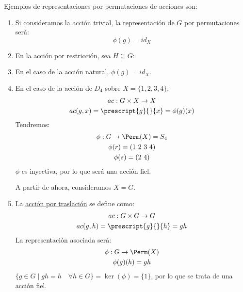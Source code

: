 \begin{ejemplo}
    Ejemplos de representaciones por permutaciones de acciones son:
    \begin{enumerate}
        \item Si consideramos la acción trivial, la representación de $G$ por permutaciones será:
            \begin{equation*}
                \phi(g) = id_X
            \end{equation*}
        \item En la acción por restricción, sea $H\subseteq G$:
            \begin{figure}[H]
                \centering
            \end{figure}
        \item En el caso de la acción natural, $\phi(g) = id_X$.
        \item En el caso de la acción de $D_4$ sobre $X = \{1,2,3,4\}$:
            \begin{gather*}
                ac:G\times X \to X \\
                ac(g,x) = \prescript{g}{}{x} = \phi(g)(x)
            \end{gather*}
            Tendremos:
            \begin{gather*}
                \phi:G\to\Perm(X) = S_4 \\
                \phi(r) = (1\ 2\ 3\ 4) \\
                \phi(s) = (2\ 4)
            \end{gather*}
            $\phi$ es inyectiva, por lo que será una acción fiel.

            A partir de ahora, consideramos $X = G$.
        \item La \underline{acción por traslación} se define como:
            \begin{gather*}
                ac:G\times G \to G \\
                ac(g,h) = \prescript{g}{}{h} = gh
            \end{gather*}
            La representación asociada será:
            \begin{gather*}
                \phi:G\to\Perm(X) \\
                \phi(g)(h) = gh
            \end{gather*}
            $\{g\in G\mid gh = h \quad \forall h\in G\} = \ker(\phi) = \{1\}$, por lo que se trata de una acción fiel.
    \end{enumerate}
\end{ejemplo}

